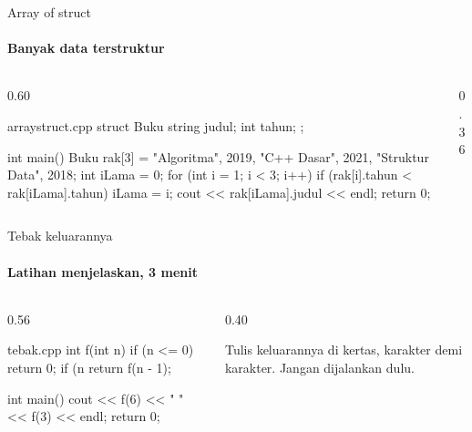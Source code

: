 \documentclass[t]{beamer}
\begin{document}
\begin{frame}[fragile]{Array of struct}
\framesubtitle{Banyak data terstruktur}
\begin{columns}[T]
\begin{column}{0.60\textwidth}
\begin{Kode}[listing options={style=ITERACodeKecil}]{arraystruct.cpp}
struct Buku { string judul; int tahun; };

int main() {
    Buku rak[3] = {{"Algoritma", 2019},
                   {"C++ Dasar", 2021},
                   {"Struktur Data", 2018}};
    int iLama = 0;
    for (int i = 1; i < 3; i++)
        if (rak[i].tahun < rak[iLama].tahun) iLama = i;
    cout << rak[iLama].judul << endl;
    return 0;
}
\end{Kode}
\end{column}
\begin{column}{0.36\textwidth}
\end{column}
\end{columns}
\end{frame}

\begin{frame}[fragile]{Tebak keluarannya}
\framesubtitle{Latihan menjelaskan, 3 menit}
\begin{columns}[T]
\begin{column}{0.56\textwidth}
\begin{Kode}[]{tebak.cpp}
int f(int n) {
    if (n <= 0) return 0;
    if (n %
    return f(n - 1);
}

int main() {
    cout << f(6) << " " << f(3) << endl;
    return 0;
}
\end{Kode}
\end{column}
\begin{column}{0.40\textwidth}
\begin{Catatan}
Tulis keluarannya di kertas, karakter demi karakter. Jangan dijalankan dulu.
\end{Catatan}
\end{column}
\end{columns}
\end{frame}
\end{document}
